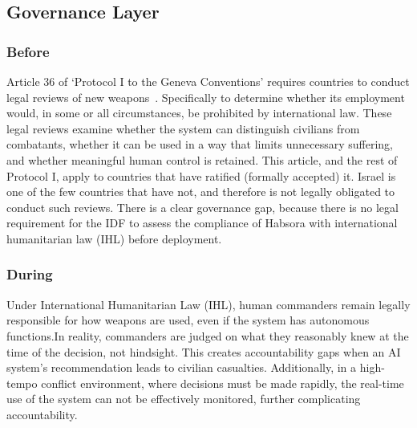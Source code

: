\subsection{Governance Layer}

\subsubsection{Before}

Article 36 of `Protocol I to the Geneva Conventions' requires countries to conduct legal reviews of new weapons~\citet{icrc_api_article36_1977}. Specifically to determine whether its employment would, in some or all circumstances, be prohibited by international law. These legal reviews examine whether the system can distinguish civilians from combatants, whether it can be used in a way that limits unnecessary suffering, and whether meaningful human control is retained. This article, and the rest of Protocol I, apply to countries that have ratified (formally accepted) it. Israel is one of the few countries that have not, and therefore is not legally obligated to conduct such reviews. There is a clear governance gap, because there is no legal requirement for the IDF to assess the compliance of Habsora with international humanitarian law (IHL) before deployment.



\subsubsection{During}

Under International Humanitarian Law (IHL), human commanders remain legally responsible for how weapons are used, even if the system has autonomous functions.In reality, commanders are judged on what they reasonably knew at the time of the decision, not hindsight. This creates accountability gaps when an AI system's recommendation leads to civilian casualties. Additionally, in a high-tempo conflict environment, where decisions must be made rapidly, the real-time use of the system can not be effectively monitored, further complicating accountability.


